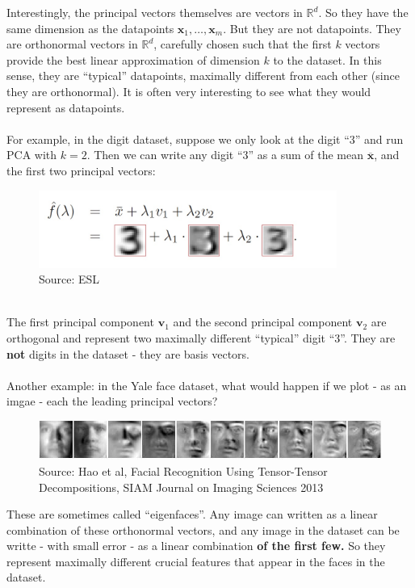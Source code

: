 \documentclass[11pt]{article}
\newcommand{\R}{\ensuremath{\mathbb{R}}}
\newcommand{\V}[1]{\mathbf{#1}}
\begin{document}
Interestingly, the principal vectors themselves are vectors in $\R^d$. 
So they have the same dimension as the datapoints $\V{x}_1,\ldots,\V{x}_m$. But
they are not datapoints. They are orthonormal vectors in $\R^d$, carefully
chosen such that the first $k$ vectors provide the best linear approximation of
dimension $k$ to the dataset. In this sense, they are ``typical'' datapoints,
maximally different from each other (since they are orthonormal). It is often
very interesting to see what they would represent as datapoints.
\\~\\
For example, in the digit dataset, suppose we only look at the digit ``3'' and
run PCA with $k=2$. Then we can write any digit ``3'' as a sum of the mean
$\overline{\V{x}}$, and the first two principal vectors:
\begin{figure}[H]
      \centering
      \includegraphics[height=1in]{3_pca_sum.jpeg}        
      \caption{Source: ESL}
    \end{figure}
~\\
The first principal component $\V{v}_1$ and the second principal component
$\V{v}_2$ are orthogonal and represent two maximally different 
``typical'' digit ``3''. They are {\bf not} digits in the dataset - they are
basis vectors. 
\\~\\
Another example: in the Yale face dataset, what would happen if we plot - as an
imgae - each the
leading principal vectors?
\begin{figure}[H]
      \centering
      \includegraphics[width=6in]{yale_eigenfaces.png}        
      \caption{Source: Hao et al, Facial Recognition Using Tensor-Tensor
      Decompositions, SIAM Journal on Imaging Sciences 2013}
    \end{figure}
    These are sometimes called ``eigenfaces''. Any image can
    written as a linear combination of these orthonormal vectors, and any image
    in the dataset can be writte - with small error - as a linear combination 
    {\bf of the first few.} So they represent maximally different 
    crucial features that appear in the faces in the dataset.
\end{document}
